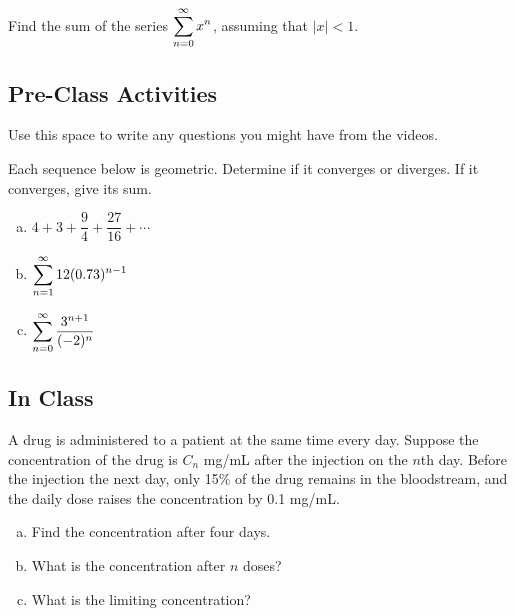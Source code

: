 \documentclass[notes]{subfiles}
\begin{document}
		\begin{ex}
			Find the sum of the series $\displaystyle \sum_{n = 0}^\infty x^n$, assuming that $|x| < 1$.
		\end{ex}
			\newpage
			
	\subsection*{Pre-Class Activities}
		\begin{ex}
			Use this space to write any questions you might have from the videos.
		\end{ex}
			
		\begin{ex}
			Each sequence below is geometric.  Determine if it converges or diverges.  If it converges, give its sum.
			\begin{enumerate}[(a)]
				\item $4 + 3 + \dfrac{9}{4} + \dfrac{27}{16}+ \cdots$
					
				\item $\displaystyle \sum_{n=1}^\infty 12(0.73)^{n-1}$
					
				\item $\displaystyle \sum_{n=0}^\infty \dfrac{3^{n+1}}{(-2)^n}$
			\end{enumerate}
		\end{ex}
			\newpage
			
	\subsection*{In Class}
		\begin{ex}
			A drug is administered to a patient at the same time every day.  Suppose the concentration of the drug is $C_n$ mg/mL after the injection on the $n$th day.  Before the injection the next day, only 15\% of the drug remains in the bloodstream, and the daily dose raises the concentration by 0.1 mg/mL.
			\begin{enumerate}[(a)]
				\item Find the concentration after four days.
					\vs{1}
					
				\item What is the concentration after $n$ doses?
					\vs{1}
				
				\item What is the limiting concentration?
					\vs{1}
			\end{enumerate}
		\end{ex}
		
\end{document}
